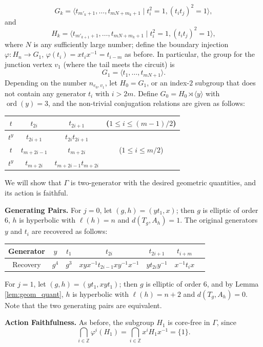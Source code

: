 \documentclass[12pt,leqno]{amsart}
\makeatletter
\renewenvironment{proof}[1][\proofname]{%
	\par
	\pushQED{\qed}%
	\normalfont
	\topsep6\p@\@plus6\p@\relax
	\trivlist
	\item[\hskip\labelsep\itshape #1\@addpunct{.}]%
	\ignorespaces
}{%
	\par\nobreak\vspace{2pt}%
	\popQED%
	\medskip%
	\endtrivlist
	\@endpefalse
}
\newcommand{\2}{L^2_{\rm per}(0, T)}
\newcommand{\ord}{{\operatorname{ord}}}
\numberwithin{equation}{section}
\numberwithin{figure}{section}
\makeatother
\begin{document}
\[
G_k = \langle t_{m'_k+1},\dots, t_{mN+m_k+1}\mid t_i^2=1, (t_it_{j})^2 = 1\rangle,
\]
and
\[
H_k = \langle t_{m'_{k+1}+1},\dots, t_{mN+m_k+1}\mid t_i^2=1, (t_it_{j})^2 = 1\rangle,
\]
where $N$ is any sufficiently large number; define the boundary injection $\varphi: H_n\to G_1$, $\varphi(t_{i}) = xt_ix^{-1} = t_{i-m}$ as before. In particular, the group for the junction vertex $v_1$ (where the tail meets the circuit) is
\[
G_1 = \langle t_1,\dots, t_{mN+1}\rangle.
\]
Depending on the number $n_{e_0, v_1}$, let $H_0 = G_1$, or an index-$2$ subgroup that does not contain any generator $t_i$ with $i>2m$. Define $G_0 = H_0\rtimes \langle y\rangle$ with $\ord(y) = 3$, and the non-trivial conjugation relations are given as follows:
\begin{center}
    \begin{tabular}{c||c|cc}
        $t$ & $t_{2i}$ & $t_{2i+1}$ & ($1\leq i\leq (m-1)/2$) \\
        \hline
        $t^y$ & $t_{2i+1}$ & $t_{2i}t_{2i+1}$\\
        \hline
        $t$ & $t_{m+2i-1}$ & $t_{m+2i}$ & ($1\leq i\leq m/2$) \\
        \hline
        $t^y$ & $t_{m+2i}$ & $t_{m+2i-1}t_{m+2i}$\\
    \end{tabular}
\end{center}
We will show that $\Gamma$ is two-generator with the desired geometric quantities, and its action is faithful.
\begin{proof}
    \textbf{Generating Pairs.} For $j=0$, let $(g,h) = (yt_1,x)$; then $g$ is elliptic of order $6$, $h$ is hyperbolic with $\ell(h) = n$ and $d(T_g,A_h) = 1$. The original generators $y$ and $t_i$ are recovered as follows:
    \begin{center}
        \begin{tabular}{c||c|c|c|c|c|c}
            Generator & $y$ & $t_1$ & $t_{2i}$ & $t_{2i+1}$ & $t_{i+m}$ \\
            \hline
            Recovery & $g^4$ & $g^3$  & $xyx^{-1}t_{2i-1}xy^{-1}x^{-1}$ & $yt_{2i}y^{-1}$ & $x^{-1}t_ix$
        \end{tabular}
    \end{center}

    For $j=1$, let $(g,h) = (yt_1,xyt_1)$; then $g$ is elliptic of order $6$, and by Lemma \ref{lem:geom_quant}, $h$ is hyperbolic with $\ell(h) = n+2$ and $d(T_g,A_h) = 0$. Note that the two generating pairs are equivalent.

    \textbf{Action Faithfulness.} As before, the subgroup $H_1$ is core-free in $\Gamma$, since
    \[
    \bigcap_{i\in\mathbb{Z}}\varphi^i(H_1) = \bigcap_{i\in\mathbb{Z}} x^i H_1 x^{-1} = \{1\}.
    \]
    
\end{proof}
\end{document}
